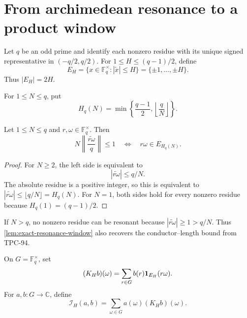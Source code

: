 \section{From archimedean resonance to a product window}
\label{sec:resonance-carrier}

Let \(q\) be an odd prime and identify each nonzero residue with its
unique signed representative in \((-q/2,q/2)\).  For
\(1\le H\le(q-1)/2\), define
\begin{equation}
 E_H
 =
 \{x\in\mathbb F_q^\times:|\widetilde x|\le H\}
 =
 \{\pm1,\ldots,\pm H\}.
\label{eq:EH}
\end{equation}
Thus \(|E_H|=2H\).

For \(1\le N\le q\), put
\begin{equation}
 H_q(N)
 =
 \min\!\left\{\frac{q-1}{2},\left\lfloor\frac qN\right\rfloor\right\}.
\label{eq:HqN}
\end{equation}

\begin{lemma}
\label{lem:exact-resonance-window}
Let \(1\le N\le q\) and \(r,\omega\in\mathbb F_q^\times\).  Then
\[
 N\left\|\frac{\widetilde{r\omega}}q\right\|\le1
 \quad\Longleftrightarrow\quad
 r\omega\in E_{H_q(N)}.
\]
\end{lemma}

\begin{proof}
For \(N\ge2\), the left side is equivalent to
\[
 |\widetilde{r\omega}|\le q/N.
\]
The absolute residue is a positive integer, so this is equivalent to
\(|\widetilde{r\omega}|\le\lfloor q/N\rfloor=H_q(N)\).
For \(N=1\), both sides hold for every nonzero residue because
\(H_q(1)=(q-1)/2\).
\end{proof}

\begin{remark}
If \(N>q\), no nonzero residue can be resonant because
\(|\widetilde{r\omega}|\ge1>q/N\).  Thus
\cref{lem:exact-resonance-window} also recovers the conductor--length
bound from TPC-94.
\end{remark}

\begin{definition}
\label{def:KH}
On \(G=\mathbb F_q^\times\), set
\begin{equation}
 (K_Hb)(\omega)
 =
 \sum_{r\in G}b(r)\mathbf 1_{E_H}(r\omega).
\label{eq:KH}
\end{equation}
For \(a,b:G\to\mathbb C\), define
\begin{equation}
 \mathcal I_H(a,b)
 =
 \sum_{\omega\in G}a(\omega)(K_Hb)(\omega).
\label{eq:incidence-form}
\end{equation}
\end{definition}

